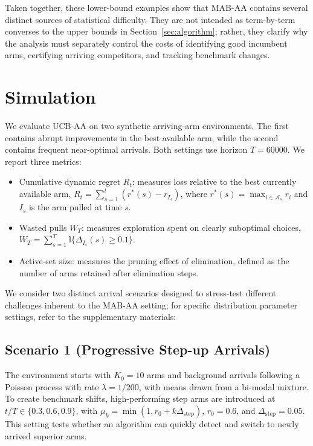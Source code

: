 \documentclass[11pt]{article}
\begin{document}
Taken together, these lower-bound examples show that MAB-AA contains several
distinct sources of statistical difficulty. They are not intended as term-by-term
converses to the upper bounds in Section~\ref{sec:algorithm}; rather, they clarify
why the analysis must separately control the costs of identifying good incumbent
arms, certifying arriving competitors, and tracking benchmark changes.


\section{Simulation}\label{sec: simulation}
We evaluate UCB-AA on two synthetic arriving-arm environments. The first
contains abrupt improvements in the best available arm, while the second
contains frequent near-optimal arrivals. Both settings use horizon \(T=60000\).
We report three metrics:
\begin{itemize}
	    \item Cumulative dynamic regret \(R_t\): measures loss relative to the best
	    currently available arm,
	    \(R_t=\sum_{s=1}^t(r^*(s)-r_{I_s})\), where
	    \(r^*(s)=\max_{i\in\mathcal A_s}r_i\) and \(I_s\) is the arm pulled at
	    time \(s\).
    \item Wasted pulls \(W_T\): measures exploration spent on clearly suboptimal
    choices,
    \(W_T=\sum_{s=1}^T\mathbb I\{\Delta_{I_s}(s)\ge0.1\}\).
    \item Active-set size: measures the pruning effect of elimination, defined
    as the number of arms retained after elimination steps.
\end{itemize}

We consider two distinct arrival scenarios designed to stress-test different challenges inherent to the MAB-AA setting; for specific distribution parameter settings, refer to the supplementary materials: 
\subsection*{Scenario 1 (Progressive Step-up Arrivals)}
The environment starts with \(K_0=10\) arms and background arrivals following a
Poisson process with rate \(\lambda=1/200\), with means drawn from a bi-modal
mixture. To create benchmark shifts, high-performing step arms are introduced at
\(t/T\in\{0.3,0.6,0.9\}\), with
\(\mu_k=\min(1,r_0+k\Delta_{\mathrm{step}})\), \(r_0=0.6\), and
\(\Delta_{\mathrm{step}}=0.05\). This setting tests whether an algorithm can
quickly detect and switch to newly arrived superior arms.
\end{document}
